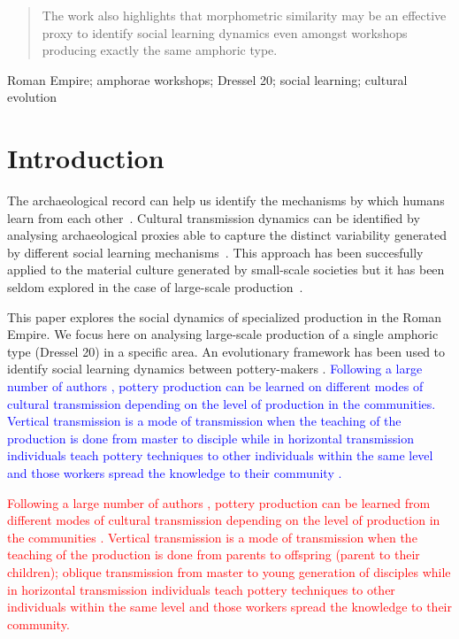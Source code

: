 \documentclass[review]{elsarticle}
\newcommand{\memo}[2]{\textcolor{#1}{#2}}
\newcommand{\maria}[1]{\memo{red}{#1\\}}
\newcommand{\revise}[1]{\memo{blue}{#1\\}}
\begin{document}
\begin{frontmatter}
\begin{abstract}
The work also highlights that morphometric similarity may be an effective proxy to identify social learning dynamics even amongst workshops producing exactly the same amphoric type. 

\end{abstract}

\begin{keyword}
Roman Empire; amphorae workshops; Dressel 20; social learning; cultural evolution
\end{keyword}

\end{frontmatter}

\linenumbers


\section{Introduction}

The archaeological record can help us identify the mechanisms by which humans learn from each other~\citep{richerson2005not,schillinger_copying_2016}. Cultural transmission dynamics can be identified by analysing archaeological proxies able to capture the distinct variability generated by different social learning mechanisms~\citep{shennan_ceramic_2001,eerkens_jelmer_cultural_2005}. This approach has been succesfully applied to the material culture generated by small-scale societies but it has been seldom explored in the case of large-scale production~\citep{shennan_isolation-by-distance_2015,neff1992ceramics}.

This paper explores the social dynamics of specialized production in the Roman Empire. We focus here on analysing large-scale production of a single amphoric type (Dressel 20) in a specific area. An evolutionary framework has been used to identify social learning dynamics between pottery-makers \citep{mesoudi_cultural_2015, shennan_evolution_2008}. 
\revise{Following a large number of authors \citep{cavalli-sforza_cultural_1981, hosfield_modes_2009}, pottery production can be learned on different modes of cultural transmission depending on the level of production in the communities. Vertical transmission is a mode of transmission when the teaching of the production is done from master to disciple while in horizontal transmission individuals teach pottery techniques to other individuals within the same level and those workers spread the knowledge to their community \citep{epstein_craft_1998}.}

\maria{Following a large number of authors \citep{cavalli-sforza_cultural_1981,shennan_genes_2002, hosfield_modes_2009}, pottery production can be learned from different modes of cultural transmission depending on the level of production in the communities \citep{acerbi_cultural_2006}. Vertical transmission is a mode of transmission when the teaching of the production is done from parents to offspring (parent to their children); oblique transmission from master to young generation of disciples while in horizontal transmission individuals teach pottery techniques to other individuals within the same level and those workers spread the knowledge to their community.}
\end{document}
